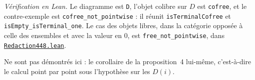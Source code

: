 \noindent\emph{Vérification en Lean.} Le diagramme est \texttt{D}, l'objet colibre sur $D$ est \texttt{cofree}, et le contre-exemple est \texttt{cofree\_not\_pointwise} : il réunit \texttt{isTerminalCofree} et \texttt{isEmpty\_isTerminal\_one}. Le cas des objets libres, dans la catégorie opposée à celle des ensembles et avec la valeur en $0$, est \texttt{free\_not\_pointwise}, dans \href{\leanblobmain/Redaction448.lean}{\texttt{Redaction448.\allowbreak{}lean}}.

Ne sont pas démontrés ici : le corollaire de la proposition~4 lui-même, c'est-à-dire le calcul point par point sous l'hypothèse sur les $D(i)$.

